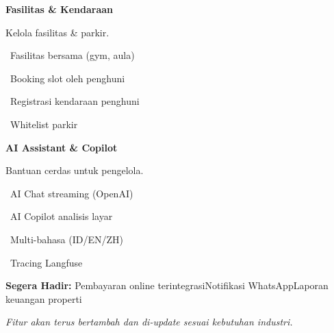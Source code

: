 \documentclass[a4paper]{article}
\begin{document}
\noindent
\begin{minipage}[t]{0.485\textwidth}
    \colorbox{OrangePrimary}{%
        \begin{minipage}{\dimexpr\textwidth-2\fboxsep\relax}
            {\fontsize{10}{13}\selectfont\bfseries\color{White} Fasilitas \& Kendaraan}
        \end{minipage}}\par
    \vspace{4pt}
    {\fontsize{9}{12}\selectfont\color{TextDark}%
    Kelola fasilitas \& parkir.\par\vspace{3pt}
    \textbullet\ Fasilitas bersama (gym, aula)\par\vspace{2pt}%
    \textbullet\ Booking slot oleh penghuni\par\vspace{2pt}%
    \textbullet\ Registrasi kendaraan penghuni\par\vspace{2pt}%
    \textbullet\ Whitelist parkir}%

\end{minipage}%
\hfill
\begin{minipage}[t]{0.485\textwidth}
    \colorbox{EmeraldDark}{%
        \begin{minipage}{\dimexpr\textwidth-2\fboxsep\relax}
            {\fontsize{10}{13}\selectfont\bfseries\color{White} AI Assistant \& Copilot}
        \end{minipage}}\par
    \vspace{4pt}
    {\fontsize{9}{12}\selectfont\color{TextDark}%
    Bantuan cerdas untuk pengelola.\par\vspace{3pt}
    \textbullet\ AI Chat streaming (OpenAI)\par\vspace{2pt}%
    \textbullet\ AI Copilot analisis layar\par\vspace{2pt}%
    \textbullet\ Multi-bahasa (ID/EN/ZH)\par\vspace{2pt}%
    \textbullet\ Tracing Langfuse}%

\end{minipage}

\vspace{8pt}

{\setlength{\fboxsep}{8pt}\setlength{\fboxrule}{0pt}%
\noindent\colorbox{BlueBg}{%
    \begin{minipage}{\dimexpr\textwidth-2\fboxsep\relax}
        {\fontsize{9}{12}\selectfont\bfseries\color{BlueDark} Segera Hadir:}\enspace
        {\fontsize{9}{12}\selectfont\color{TextDark} Pembayaran online terintegrasi\enspace\textcolor{BluePrimary}{\textbullet}\enspace Notifikasi WhatsApp\enspace\textcolor{BluePrimary}{\textbullet}\enspace Laporan keuangan properti}\par\vspace{3pt}
        {\fontsize{8.5}{11}\selectfont\color{TextLight}\textit{Fitur akan terus bertambah dan di-update sesuai kebutuhan industri.}}
    \end{minipage}}}
\end{document}
